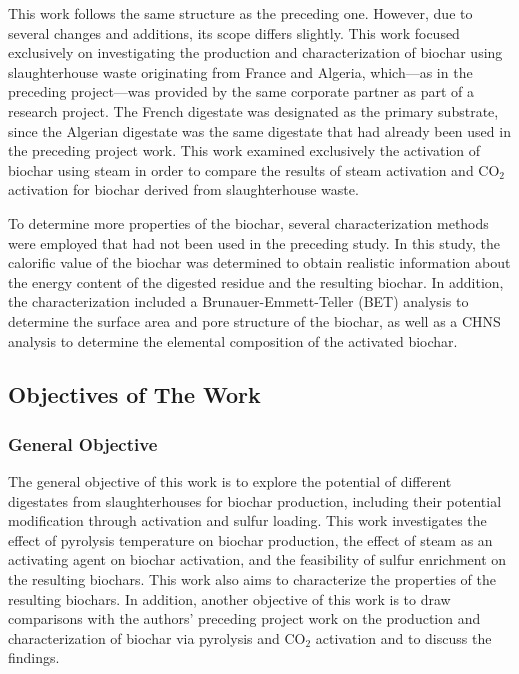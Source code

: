 This work follows the same structure as the preceding one. However, due to several changes and additions, its scope differs slightly. This work focused exclusively on investigating the production and characterization of biochar using slaughterhouse waste originating from France and Algeria, which—as in the preceding project—was provided by the same corporate partner as part of a research project. The French digestate was designated as the primary substrate, since the Algerian digestate was the same digestate that had already been used in the preceding project work. This work examined exclusively the activation of biochar using steam in order to compare the results of steam activation and CO$_2$ activation for biochar derived from slaughterhouse waste. 

\vspace{0.3em}

To determine more properties of the biochar, several characterization methods were employed that had not been used in the preceding study. In this study, the calorific value of the biochar was determined to obtain realistic information about the energy content of the digested residue and the resulting biochar. In addition, the characterization included a Brunauer-Emmett-Teller (BET) analysis to determine the surface area and pore structure of the biochar, as well as a CHNS analysis to determine the elemental composition of the activated biochar.

\subsection{Objectives of The Work}

\subsubsection{General Objective}

The general objective of this work is to explore the potential of different digestates from slaughterhouses for biochar production, including their potential modification through activation and sulfur loading. This work investigates the effect of pyrolysis temperature on biochar production, the effect of steam as an activating agent on biochar activation, and the feasibility of sulfur enrichment on the resulting biochars. This work also aims to characterize the properties of the resulting biochars. In addition, another objective of this work is to draw comparisons with the authors’ preceding project work on the production and characterization of biochar via pyrolysis and CO$_2$ activation and to discuss the findings.

